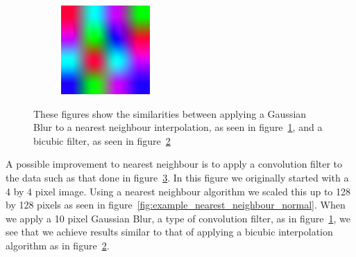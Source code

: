 \begin{figure}[H]
\begin{subfigure}{.333\textwidth}
                    \caption{}
                    \label{fig:example_nearest_neighbour_blur}
                \end{subfigure}%
                \begin{subfigure}{.333\textwidth}
                    \centering
                    \includegraphics[width=0.9\linewidth]{./images/Nearest_Neighbour_Bicubic.png}
                    \caption{}
                    \label{fig:example_nearest_neighbour_bicubic}
                \end{subfigure}
                \caption{These figures show the similarities between applying a Gaussian Blur to a nearest neighbour interpolation, as seen in figure~\ref{fig:example_nearest_neighbour_blur}, and a bicubic filter, as seen in figure~\ref{fig:example_nearest_neighbour_bicubic}}
                \label{fig:example_nearest_neighbour}
            \end{figure}

            A possible improvement to nearest neighbour is to apply a convolution filter to the data such as that done in figure~\ref{fig:example_nearest_neighbour}. In this figure we originally started with a 4 by 4 pixel image. Using a nearest neighbour algorithm we scaled this up to 128 by 128 pixels as seen in figure~\ref{fig:example_nearest_neighbour_normal}. When we apply a 10 pixel Gaussian Blur, a type of convolution filter, as in figure~\ref{fig:example_nearest_neighbour_blur}, we see that we achieve results similar to that of applying a bicubic interpolation algorithm as in figure~\ref{fig:example_nearest_neighbour_bicubic}.


